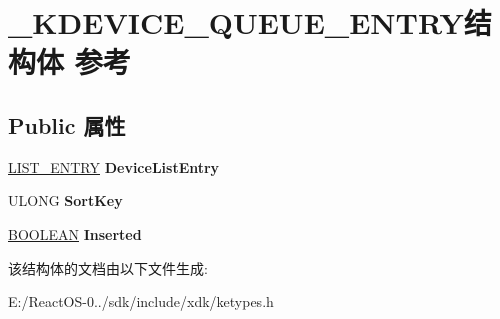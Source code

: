 \hypertarget{struct___k_d_e_v_i_c_e___q_u_e_u_e___e_n_t_r_y}{}\section{\+\_\+\+K\+D\+E\+V\+I\+C\+E\+\_\+\+Q\+U\+E\+U\+E\+\_\+\+E\+N\+T\+R\+Y结构体 参考}
\label{struct___k_d_e_v_i_c_e___q_u_e_u_e___e_n_t_r_y}
\subsection*{Public 属性}
\begin{DoxyCompactItemize}
\item 
\mbox{\label{struct___k_d_e_v_i_c_e___q_u_e_u_e___e_n_t_r_y_a2f45451f87e93014f4b15e898ac8d06b}} 
\hyperlink{struct___l_i_s_t___e_n_t_r_y}{L\+I\+S\+T\+\_\+\+E\+N\+T\+RY} {\bfseries Device\+List\+Entry}
\item 
\mbox{\label{struct___k_d_e_v_i_c_e___q_u_e_u_e___e_n_t_r_y_a31d8830ee88b7e330775e07c8ca9b42e}} 
U\+L\+O\+NG {\bfseries Sort\+Key}
\item 
\mbox{\label{struct___k_d_e_v_i_c_e___q_u_e_u_e___e_n_t_r_y_a64da69873748fcb849192f3d78113ea3}} 
\hyperlink{_processor_bind_8h_a112e3146cb38b6ee95e64d85842e380a}{B\+O\+O\+L\+E\+AN} {\bfseries Inserted}
\end{DoxyCompactItemize}


该结构体的文档由以下文件生成\+:\begin{DoxyCompactItemize}
\item 
E\+:/\+React\+O\+S-\/0../sdk/include/xdk/ketypes.\+h\end{DoxyCompactItemize}
